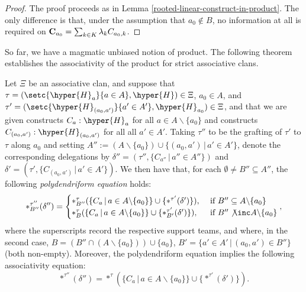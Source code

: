 \begin{proof} The proof proceeds as in Lemma \ref{rooted-linear-construct-in-product}. The only difference is that, under the assumption that $a_0\nin B$, no information at all is required on ${\bf C}_{a_0}=\sum_{k\in K}  \lambda_k C_{a_0,k}$. 
\end{proof}

So far, we have a magmatic unbiased notion of product. The following theorem establishes the associativity of the product for strict associative clans.

\begin{theorem}\label{assoc_strict}
Let $\Xi$ be an associative clan, and suppose that $\tau = (\setc{\hyper{H}_a}{a\in A},\hyper{H})\in \Xi$, $a_0\in A$, and $\tau'= (\setc{\hyper{H}_{(a_0,a')}}{a'\in A'},\hyper{H}_{a_0})\in\Xi$, 
and that we are given constructs $C_a:\hyper{H}_a$ for all $a\in A\backslash \{a_0\}$ 
and constructs $C_{(a_0,a')}:\hyper{H}_{(a_0,a')}$ for all all $a'\in A'$. Taking $\tau''$ to be the grafting of $\tau'$ to  $\tau$ along $a_0$ and  setting $A'':=(A\backslash\{a_0\})\cup\{(a_0,a')\,|\,a'\in A'\}$, denote the corresponding delegations by $\delta''=(\tau'',\{C_{a''}\,|\,a''\in  A'' \})$ and
 $\delta'=(\tau',\{C_{(a_0,a')}\,|\,a'\in A' \})$.
We then have that, for each $\emptyset\neq B''\subseteq A''$, the following {\em polydendriform equation} holds:
$$
\ast^{\tau''}_{B''}(\delta'')=\begin{cases}
\ast^{\tau}_{B''}(\{C_a\,|\,a\in A\backslash\{a_0\}\}\cup\{\ast^{\tau'}(\delta')\}), & \mbox{ if } B''\subseteq A\backslash\{a_0\}\\
\ast^{\tau}_{B}(\{C_a\,|\,a\in A\backslash\{a_0\}\}\cup \{\ast^{\tau'}_{B'}(\delta')\}), & \mbox{ if } B''\not\inc A\backslash\{a_0\}
\end{cases}
,$$ where the superscripts record the respective support teams, and  where, in the second case, $B=(B''\cap(A\backslash\{a_0\}))\cup\{a_0\}$, $B'=\{a'\in A'\,|\, (a_0,a')\in B''\}$ (both non-empty). Moreover, the polydendriform equation  implies the following associativity equation: $$\ast^{\tau''}(\delta'')=\ast^{\tau}(\{C_a\,|\,a\in A\backslash\{a_0\}\}\cup\{\ast^{\tau'}(\delta')\}).$$ 
\end{theorem}

